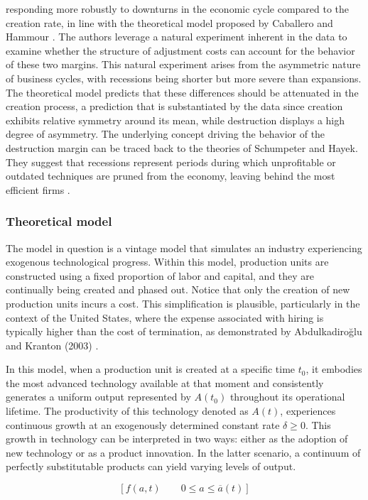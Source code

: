 \documentclass[12pt]{report}
\begin{document}
responding more robustly to downturns in the economic cycle compared to the creation rate, in line with the theoretical
model proposed by Caballero and Hammour \cite{CabHarm94}. The authors leverage a natural experiment inherent in the data
to examine whether the structure of adjustment costs can account for the behavior of these two margins. This natural
experiment arises from the asymmetric nature of business cycles, with recessions being shorter but more severe than
expansions. The theoretical model predicts that these differences should be attenuated in the creation process, a
prediction that is substantiated by the data since creation exhibits relative symmetry around its mean, while
destruction displays a high degree of asymmetry.
The underlying concept driving the behavior of the destruction margin can be traced back to the theories of Schumpeter
and Hayek.  They suggest that recessions represent periods during which unprofitable or outdated techniques are pruned
from the economy, leaving behind the most efficient firms \citet{HaCa07}.
\subsubsection{Theoretical model}
The model in question is a vintage model that simulates an industry experiencing exogenous technological progress.
Within this model, production units are constructed using a fixed proportion of labor and capital, and they are
continually being created and phased out. Notice that only the creation of new production units
incurs a cost. This simplification is plausible, particularly in the context of the United States, where the expense
associated with hiring is typically higher than the cost of termination, as demonstrated by Abdulkadiroğlu and Kranton
(2003) \cite{AbdKra03}. 
\par
In this model, when a production unit is created at a specific time \(t_0\), it embodies the most advanced technology
available at that moment and consistently generates a uniform output represented by \(A(t_0)\) throughout its
operational lifetime. The productivity of this technology denoted as \(A(t)\), experiences continuous growth at an
exogenously determined constant rate \(\delta \ge 0 \). This growth in technology can be interpreted in two ways: either
as the adoption of new technology or as a product innovation. In the latter scenario, a continuum of perfectly
substitutable products can yield varying levels of output.

\[\left[ f(a,t) \qquad 0\leq a \leq \overline{a}(t) \right]\]
\end{document}
